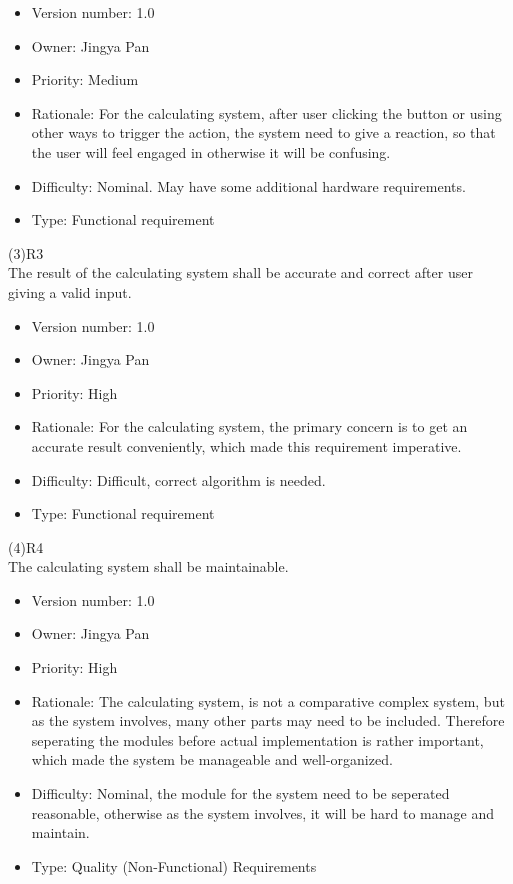 \documentclass[a4paper, 11pt]{article}
\begin{document}
\begin{itemize}
    \item Version number: 1.0
    \item Owner: Jingya Pan
    \item Priority: Medium
    \item Rationale: For the calculating system, after user clicking the button or using other ways to trigger the action, the system need to give a reaction, so that the user will feel engaged in otherwise it will be confusing.
    \item Difficulty: Nominal. May have some additional hardware requirements.
    \item Type: Functional requirement
\end{itemize}
(3)R3\\
\indent The result of the calculating system shall be accurate and correct after user giving a valid input.

\begin{itemize}
    \item Version number: 1.0
    \item Owner: Jingya Pan
    \item Priority: High
    \item Rationale: For the calculating system, the primary concern is to get an accurate result conveniently, which made this requirement imperative.
    \item Difficulty: Difficult, correct algorithm is needed.
    \item Type: Functional requirement
\end{itemize}
(4)R4\\
\indent The calculating system shall be maintainable.

\begin{itemize}
    \item Version number: 1.0
    \item Owner: Jingya Pan
    \item Priority: High
    \item Rationale: The calculating system, is not a comparative complex system, but as the system involves, many other parts may need to be included. Therefore seperating the modules before actual implementation is rather important, which made the system be manageable and well-organized.
    \item Difficulty: Nominal, the module for the system need to be seperated reasonable, otherwise as the system involves, it will be hard to manage and maintain.
    \item Type: Quality (Non-Functional) Requirements
\end{itemize}
\end{document}
